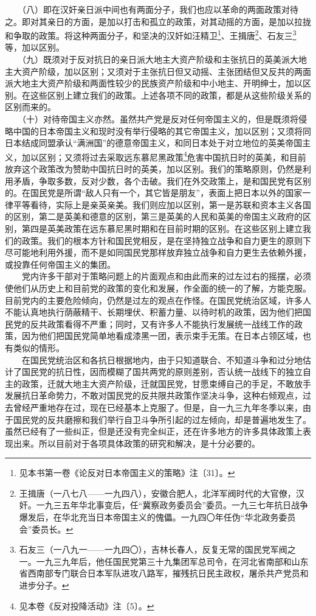 \documentclass[cn,11pt,chinese]{elegantbook}
\begin{document}
　　（八）即在汉奸亲日派中间也有两面分子，我们也应以革命的两面政策对待之。即对其亲日的方面，是加以打击和孤立的政策，对其动摇的方面，是加以拉拢和争取的政策。将这种两面分子，和坚决的汉奸如汪精卫\footnote[3]{ 见本书第一卷《论反对日本帝国主义的策略》注〔31〕。}、王揖唐\footnote[4]{ 王揖唐（一八七八——一九四八），安徽合肥人，北洋军阀时代的大官僚，汉奸。一九三五年华北事变后，任“冀察政务委员会”委员。一九三七年抗日战争爆发后，在华北充当日本帝国主义的傀儡。一九四〇年任伪“华北政务委员会”委员长。}、石友三\footnote[5]{ 石友三（一八九一——一九四〇），吉林长春人，反复无常的国民党军阀之一。一九三九年后，他任国民党第三十九集团军总司令，在河北省南部和山东省西南部专门联合日本军队进攻八路军，摧残抗日民主政权，屠杀共产党员和进步分子。}等，加以区别。\\
　　（九）既须对于反对抗日的亲日派大地主大资产阶级和主张抗日的英美派大地主大资产阶级，加以区别；又须对于主张抗日但又动摇、主张团结但又反共的两面派大地主大资产阶级和两面性较少的民族资产阶级和中小地主、开明绅士，加以区别。在这些区别上建立我们的政策。上述各项不同的政策，都是从这些阶级关系的区别而来的。\\
　　（十）对待帝国主义亦然。虽然共产党是反对任何帝国主义的，但是既须将侵略中国的日本帝国主义和现时没有举行侵略的其它帝国主义，加以区别；又须将同日本结成同盟承认“满洲国”的德意帝国主义，和同日本处于对立地位的英美帝国主义，加以区别；又须将过去采取远东慕尼黑政策\footnote[6]{ 见本卷《反对投降活动》注〔5〕。}危害中国抗日时的英美，和目前放弃这个政策改为赞助中国抗日时的英美，加以区别。我们的策略原则，仍然是利用矛盾，争取多数，反对少数，各个击破。我们在外交政策上，是和国民党有区别的。在国民党是所谓“敌人只有一个，其它皆是朋友”，表面上把日本以外的国家一律平等看待，实际上是亲英亲美。我们则应加以区别，第一是苏联和资本主义各国的区别，第二是英美和德意的区别，第三是英美的人民和英美的帝国主义政府的区别，第四是英美政策在远东慕尼黑时期和在目前时期的区别。在这些区别上建立我们的政策。我们的根本方针和国民党相反，是在坚持独立战争和自力更生的原则下尽可能地利用外援，而不是如同国民党那样放弃独立战争和自力更生去依赖外援，或投靠任何帝国主义的集团。\\
　　党内许多干部对于策略问题上的片面观点和由此而来的过左过右的摇摆，必须使他们从历史上和目前党的政策的变化和发展，作全面的统一的了解，方能克服。目前党内的主要危险倾向，仍然是过左的观点在作怪。在国民党统治区域，许多人不能认真地执行荫蔽精干、长期埋伏、积蓄力量、以待时机的政策，因为他们把国民党的反共政策看得不严重；同时，又有许多人不能执行发展统一战线工作的政策，因为他们把国民党简单地看成漆黑一团，表示束手无策。在日本占领区域，也有类似的情形。\\
　　在国民党统治区和各抗日根据地内，由于只知道联合、不知道斗争和过分地估计了国民党的抗日性，因而模糊了国共两党的原则差别，否认统一战线下的独立自主的政策，迁就大地主大资产阶级，迁就国民党，甘愿束缚自己的手足，不敢放手发展抗日革命势力，不敢对国民党的反共限共政策作坚决斗争，这种右倾观点，过去曾经严重地存在过，现在已经基本上克服了。但是，自一九三九年冬季以来，由于国民党的反共磨擦和我们举行自卫斗争所引起的过左倾向，却是普遍地发生了。虽然已经有了一些纠正，但是还没有完全纠正，还在许多地方的许多具体政策上表现出来。所以目前对于各项具体政策的研究和解决，是十分必要的。\\
\end{document}
